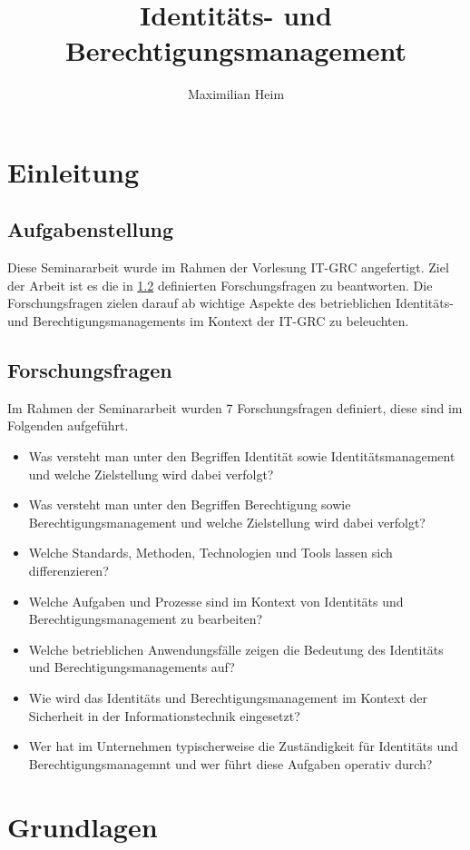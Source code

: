 \documentclass[11pt]{article}
\author{Maximilian Heim}
\title{Identitäts- und Berechtigungsmanagement}
\begin{document}
\maketitle
\newpage
\tableofcontents
\newpage
\section{Einleitung}
\subsection{Aufgabenstellung}
Diese Seminararbeit wurde im Rahmen der Vorlesung IT-GRC angefertigt. Ziel der Arbeit ist es die in \cref{subsec:forschungsfragen} definierten Forschungsfragen zu beantworten. Die Forschungsfragen zielen darauf ab wichtige Aspekte des betrieblichen Identitäts- und Berechtigungsmanagements im Kontext der IT-GRC zu beleuchten.
\subsection{Forschungsfragen}
\label{subsec:forschungsfragen}
Im Rahmen der Seminararbeit wurden 7 Forschungsfragen definiert, diese sind im Folgenden aufgeführt.
\begin{itemize}
  \item Was versteht man unter den Begriffen \glqq{}Identität\grqq{} sowie \glqq{}Identitätsmanagement\grqq{} und welche Zielstellung wird dabei verfolgt?
  \item Was versteht man unter den Begriffen \glqq{}Berechtigung\grqq{} sowie \glqq{}Berechtigungsmanagement\grqq{} und welche Zielstellung wird dabei verfolgt?
  \item Welche Standards, Methoden, Technologien und Tools lassen sich differenzieren?
  \item Welche Aufgaben und Prozesse sind im Kontext von Identitäts und Berechtigungsmanagement zu bearbeiten?
  \item Welche betrieblichen Anwendungsfälle zeigen die Bedeutung des Identitäts und Berechtigungsmanagements auf?
  \item Wie wird das Identitäts und Berechtigungsmanagement im Kontext der Sicherheit in der Informationstechnik eingesetzt?
  \item Wer hat im Unternehmen typischerweise die Zuständigkeit für Identitäts und Berechtigungsmanagemnt und wer führt diese Aufgaben operativ durch?
\end{itemize}
\section{Grundlagen}
\label{sec:grundlagen}
\end{document}
